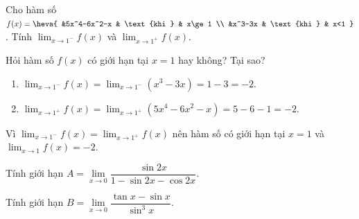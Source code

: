 \begin{bt}%
	Cho hàm số $f(x)=\heva{
		&5x^4-6x^2-x & \text{khi } & x\ge1 \\ 
		&x^3-3x & \text{khi } & x<1
	}$. Tính $\displaystyle\lim_{x\to 1^-}f(x)$ và $\displaystyle\lim_{x\to 1^+}f(x)$.
	
	Hỏi hàm số $f(x)$ có giới hạn tại $x=1$ hay không? Tại sao?
	
	\loigiai
	{
		\begin{enumerate}
			\item $\displaystyle\lim_{x\to 1^-}f(x)=\lim_{x\to 1^-}(x^3-3x)=1-3=-2$.
			\item $\displaystyle\lim_{x\to 1^+}f(x)=\lim_{x\to 1^+}(5x^4-6x^2-x)=5-6-1=-2$.
		\end{enumerate}
		Vì $\displaystyle\lim_{x\to 1^-}f(x) = \lim_{x\to 1^+}f(x)$ nên hàm số có giới hạn tại $x=1$ và $\displaystyle\lim_{x\to 1}f(x)=-2$.
	}
	
\end{bt}

\begin{bt}%
	Tính giới hạn $A=\underset{x \rightarrow 0}{\lim} \dfrac{\sin 2x}{1-\sin 2x-\cos 2x}$.
\end{bt}

\begin{bt}%
	Tính giới hạn $B=\underset{x \rightarrow 0}{\lim} \dfrac{\tan x-\sin x}{\sin ^3x}$.
\end{bt}

